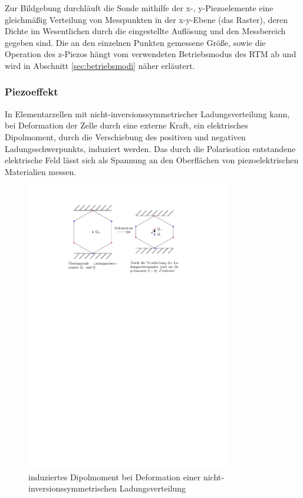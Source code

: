 \documentclass[10pt, a4paper]{article}
\begin{document}
Zur Bildgebung durchläuft die Sonde mithilfe der x-, y-Piezoelemente eine gleichmäßig Verteilung von Messpunkten in der x-y-Ebene (das Raster), deren Dichte im Wesentlichen durch die eingestellte Auflösung und den Messbereich gegeben sind.
Die an den einzelnen Punkten gemessene Größe, sowie die Operation des z-Piezos hängt vom verwendeten Betriebsmodus des RTM ab und wird in Abschnitt \ref{sec:betriebsmodi} näher erläutert.


\subsubsection{Piezoeffekt}
\label{sssec:Piezoeffekt}
In Elementarzellen mit nicht-inversionssymmetrischer Ladungsverteilung kann, bei Deformation der Zelle durch eine externe Kraft, ein elektrisches Dipolmoment, durch die Verschiebung des positiven und negativen Ladungsschwerpunkts, induziert werden.
Das durch die Polarisation entstandene elektrische Feld lässt sich als Spannung an den Oberflächen von piezoelektrischen Materialien messen.
\begin{figure}[h]
\centering
\includegraphics[width=0.8\textwidth]{./grafiken/piezoeffekt.pdf}
\caption{induziertes Dipolmoment bei Deformation einer nicht-inversionssymmetrischen Ladungsverteilung}
\end{figure}
\end{document}

